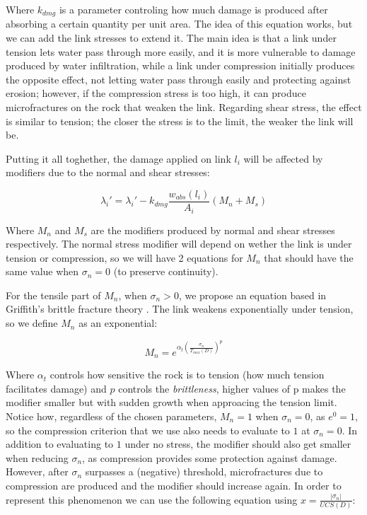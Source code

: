Where $k_{dmg}$ is a parameter controling how much damage is produced 
after absorbing a certain quantity per unit area. The idea of this equation 
works, but we can add the link stresses to extend it. The main idea is 
that a link under tension lets water pass through more easily, and it is 
more vulnerable to damage produced by water infiltration, while a link under
compression initially produces the opposite effect, not letting water pass through easily and
protecting against 
erosion; however, if the compression stress is too high, it can produce 
microfractures on the rock that weaken the link. Regarding shear stress, 
the effect is similar to tension; the closer the stress is to the limit, 
the weaker the link will be.

\vspace{10pt}

Putting it all toghether, the damage applied on link $l_i$ will be affected
by modifiers due to the normal and shear stresses:

\begin{equation}
    \lambda_i' = \lambda_i' - k_{dmg}\frac{w_{abs}(l_i)}{A_i}(M_n + M_s)
\end{equation}

Where $M_n$ and $M_s$ are the modifiers produced by normal and shear stresses
respectively. The normal stress modifier will depend on wether the link 
is under tension or compression, so we will have 2 equations for $M_n$ 
that should have the same value when $\sigma_n = 0$ (to preserve continuity). 

\vspace{10pt}

For the tensile part of $M_n$, when $\sigma_n > 0$, we propose an 
equation based in Griffith's brittle fracture theory \cite{WU201820}. The 
link weakens exponentially under tension, so we define $M_n$ as an exponential:

\begin{equation}
    M_n = e^{\alpha_t(\frac{\sigma_n}{T_{max}(D)})^p}
\end{equation}

Where $\alpha_t$ controls how sensitive the rock is to tension (how much 
tension facilitates damage) and 
$p$ controls the \textit{brittleness}, higher values of p makes the 
modifier smaller but with sudden growth when approacing the tension limit. 
Notice how, regardless of the chosen parameters, $M_n = 1$ when $\sigma_n = 0$, 
as $e^0 = 1$, so the compression criterion that we use also needs to 
evaluate to $1$ at $\sigma_n = 0$. In addition to evaluating to $1$ under 
no stress, the modifier should also get smaller when reducing $\sigma_n$, 
as compression provides some protection against damage. However, after 
$\sigma_n$ surpasses a (negative) threshold, microfractures due to compression 
are produced and the modifier should increase again. In order to represent 
this phenomenon we can use the following equation using $x = \frac{|\sigma_n|}{UCS(D)}$:

